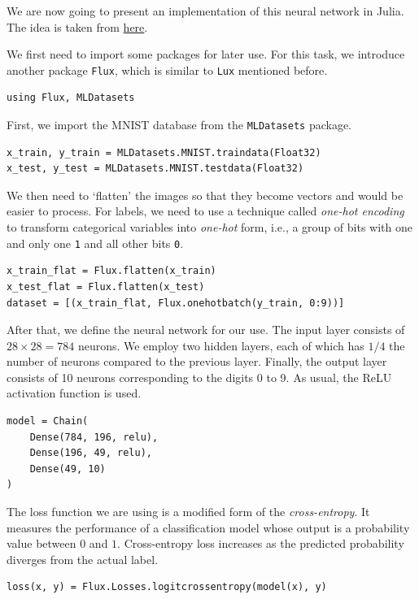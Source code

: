 \documentclass[a4paper,11pt,titlepage]{article}
\theoremstyle{definition}
\theoremstyle{plain}
\theoremstyle{remark}
\begin{document}
We are now going to present an implementation of this neural network in Julia. The idea is taken from \href{https://github.com/piotrek124-1/Simple_MNIST_Julia/tree/main}{here}.

We first need to import some packages for later use. For this task, we introduce another package \verb|Flux|, which is similar to \verb|Lux| mentioned before. 

\begin{verbatim}
using Flux, MLDatasets
\end{verbatim}

First, we import the MNIST database from the \verb|MLDatasets| package.

\begin{verbatim}
x_train, y_train = MLDatasets.MNIST.traindata(Float32)
x_test, y_test = MLDatasets.MNIST.testdata(Float32)
\end{verbatim}

We then need to ‘flatten’ the images so that they become vectors and would be easier to process. For labels, we need to use a technique called \textit{one-hot encoding} to transform categorical variables into \textit{one-hot} form, i.e., a group of bits with one and only one \verb|1| and all other bits \verb|0|.

\begin{verbatim}
x_train_flat = Flux.flatten(x_train)
x_test_flat = Flux.flatten(x_test)
dataset = [(x_train_flat, Flux.onehotbatch(y_train, 0:9))]
\end{verbatim}

After that, we define the neural network for our use. The input layer consists of $28\times 28 = 784$ neurons. We employ two hidden layers, each of which has $1/4$ the number of neurons compared to the previous layer. Finally, the output layer consists of 10 neurons corresponding to the digits 0 to 9. As usual, the ReLU activation function is used.

\begin{verbatim}
model = Chain(
    Dense(784, 196, relu),
    Dense(196, 49, relu),
    Dense(49, 10)
)
\end{verbatim}

The loss function we are using is a modified form of the \textit{cross-entropy}. It measures the performance of a classification model whose output is a probability value between $0$ and $1$. Cross-entropy loss increases as the predicted probability diverges from the actual label.

\begin{verbatim}
loss(x, y) = Flux.Losses.logitcrossentropy(model(x), y)
\end{verbatim}
\end{document}
